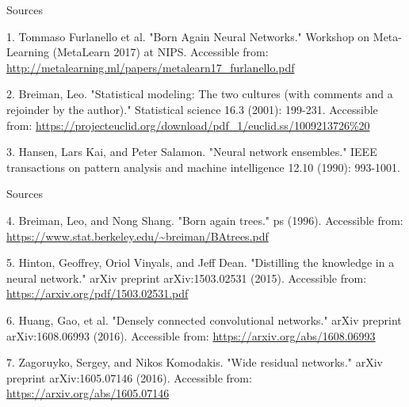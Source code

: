 \documentclass{beamer}
\begin{document}
\begin{frame}{Sources}

\begin{thebibliography}{0}

   1. Tommaso Furlanello et al. "Born Again Neural Networks." Workshop on Meta-Learning (MetaLearn 2017) at NIPS. Accessible from: \url{http://metalearning.ml/papers/metalearn17_furlanello.pdf}
  
   2. Breiman, Leo. "Statistical modeling: The two cultures (with comments and a rejoinder by the author)." Statistical science 16.3 (2001): 199-231. Accessible from: \url{https://projecteuclid.org/download/pdf_1/euclid.ss/1009213726\%20}
  
   3. Hansen, Lars Kai, and Peter Salamon. "Neural network ensembles." IEEE transactions on pattern analysis and machine intelligence 12.10 (1990): 993-1001.
\end{thebibliography}

\end{frame}


\begin{frame}{Sources}

\begin{thebibliography}{0}
   4. Breiman, Leo, and Nong Shang. "Born again trees." ps (1996). Accessible from: \url{https://www.stat.berkeley.edu/~breiman/BAtrees.pdf}
  
   5. Hinton, Geoffrey, Oriol Vinyals, and Jeff Dean. "Distilling the knowledge in a neural network." arXiv preprint arXiv:1503.02531 (2015). Accessible from: \url{https://arxiv.org/pdf/1503.02531.pdf}
  
   6. Huang, Gao, et al. "Densely connected convolutional networks." arXiv preprint arXiv:1608.06993 (2016). Accessible from: \url{https://arxiv.org/abs/1608.06993}
  
   7. Zagoruyko, Sergey, and Nikos Komodakis. "Wide residual networks." arXiv preprint arXiv:1605.07146 (2016). Accessible from: \url{https://arxiv.org/abs/1605.07146}
\end{thebibliography}

\end{frame}
 
 
 
\end{document}
